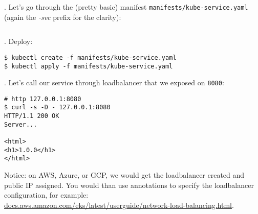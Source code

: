 \documentclass[12pt, letterpaper]{article}
\begin{document}
\begin{figure}[ht]
\centering
{}
\end{figure}

. Let's go through the (pretty basic) manifest \texttt{manifests/kube-service.yaml} (again the \emph{-svc} prefix for the clarity):

\inputminted{yaml}{manifests/kube-service.yaml}

. Deploy:

\begin{verbatim}
$ kubectl create -f manifests/kube-service.yaml
$ kubectl apply -f manifests/kube-service.yaml
\end{verbatim}

. Let's call our service through loadbalancer that we exposed on \verb|8080|:

\begin{verbatim}
# http 127.0.0.1:8080
$ curl -s -D - 127.0.0.1:8080
HTTP/1.1 200 OK
Server...

<html>
<h1>1.0.0</h1>
</html>
\end{verbatim}

Notice: on {\small AWS}, Azure, or {\small GCP}, we would get the loadbalancer created and public {\small IP} assigned. You would than use annotations to specify the loadbalancer configuration, for example:\\ \href{https://docs.aws.amazon.com/eks/latest/userguide/network-load-balancing.html}{docs.aws.amazon.com/eks/latest/userguide/network-load-balancing.html}.
\end{document}
